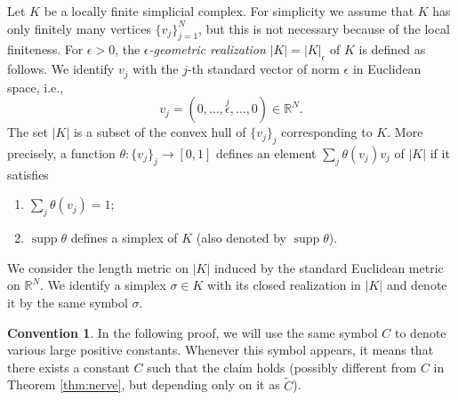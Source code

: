\documentclass[a4paper,12pt]{amsart}
\theoremstyle{plain}
\theoremstyle{definition}
\newtheorem{conv}[thm]{Convention}
\numberwithin{thm}{section}
\numberwithin{equation}{section}
\DeclareMathOperator{\supp}{supp}
\begin{document}
Let $K$ be a locally finite simplicial complex.
For simplicity we assume that $K$ has only finitely many vertices $\{v_j\}_{j=1}^N$, but this is not necessary because of the local finiteness.
For $\epsilon>0$, the \textit{$\epsilon$-geometric realization} $|K|=|K|_\epsilon$ of $K$ is defined as follows.
We identify $v_j$ with the $j$-th standard vector of norm $\epsilon$ in Euclidean space, i.e.,
\[v_j=(0,\dots,\overset j\epsilon,\dots,0)\in\mathbb R^N.\]
The set $|K|$ is a subset of the convex hull of $\{v_j\}_j$ corresponding to $K$.
More precisely, a function $\theta:\{v_j\}_j\to[0,1]$ defines an element $\sum_j\theta(v_j)v_j$ of $|K|$ if it satisfies
\begin{enumerate}
\item $\sum_j \theta(v_j)=1;$
\item $\supp\theta$ defines a simplex of $K$ (also denoted by $\supp\theta$).
\end{enumerate}
We consider the length metric on $|K|$ induced by the standard Euclidean metric on $\mathbb R^N$.
We identify a simplex $\sigma\in K$ with its closed realization in $|K|$ and denote it by the same symbol $\sigma$.

\begin{conv}\label{conv:C}
In the following proof, we will use the same symbol $C$ to denote various large positive constants.
Whenever this symbol appears, it means that there exists a constant $C$ such that the claim holds (possibly different from $C$ in Theorem \ref{thm:nerve}, but depending only on it as $\tilde C$).
\end{conv}
\end{document}
